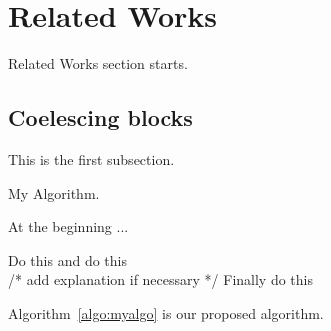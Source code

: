 \section{Related Works}
Related Works section starts. 

\subsection{Coelescing blocks}
This is the first subsection. 


\begin{algorithm}
	\caption{My Algorithm.} \label{algo:myalgo}
    At the beginning ...
    
	\begin{algorithmic}[1]	    
	    \STATE Do this
        \STATE and do this\\
        /* add explanation if necessary */
        \STATE Finally do this
	\end{algorithmic} 
\end{algorithm}
%
Algorithm~\ref{algo:myalgo} is our proposed algorithm.